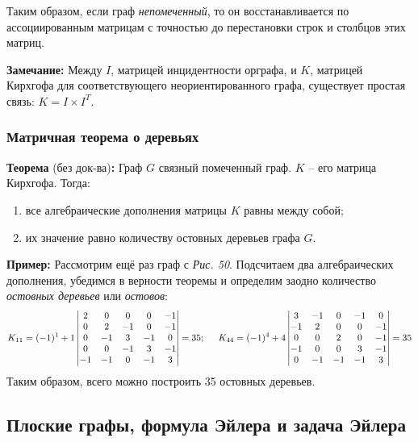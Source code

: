 \documentclass[12pt, a4paper]{article}
\begin{document}
Таким образом, если граф \textit{непомеченный}, то он восстанавливается по ассоциированным матрицам с точностью до перестановки строк и столбцов этих матриц.

\textbf{Замечание:} Между $I$, матрицей инцидентности орграфа, и $K$, матрицей Кирхгофа для соответствующего неориентированного графа, существует простая связь: $K = I \times I^T$.

\subsubsection{Матричная теорема о деревьях}

\textbf{Теорема} (без док-ва)\textbf{:} Граф $G$ связный помеченный граф. $K$ -- его матрица Кирхгофа. Тогда:
\begin{enumerate}
\item все алгебраические дополнения матрицы $K$ равны между собой;
\item их значение равно количеству остовных деревьев графа $G$.
\end{enumerate}

\textbf{Пример:} Рассмотрим ещё раз граф с \textit{Рис. 50}. Подсчитаем два алгебраических дополнения, убедимся в верности теоремы и определим заодно количество \textit{остовных деревьев} или \textit{остовов}:
\[K_{11} = (-1)^1+1 \begin{vmatrix}
2 & 0 & 0 & 0 & -1 \\
0 & 2 & -1 & 0 & -1 \\
0 & -1 & 3 & -1 & 0 \\
0 & 0 & -1 & 3 & -1 \\
-1 & -1 & 0 & -1 & 3 \\
\end{vmatrix} = 35; \hspace{5mm}
K_{44} = (-1)^4+4 \begin{vmatrix}
3 & -1 & 0 & -1 & 0 \\
-1 & 2 & 0 & 0 & -1 \\
0 & 0 & 2 & 0 & -1 \\
-1 & 0 & 0 & 3 & -1 \\
0 & -1 & -1 & -1 & 3 \\
\end{vmatrix} = 35 \]
Таким образом, всего можно построить 35 остовных деревьев.

\subsection{Плоские графы, формула Эйлера и задача Эйлера}
\end{document}
